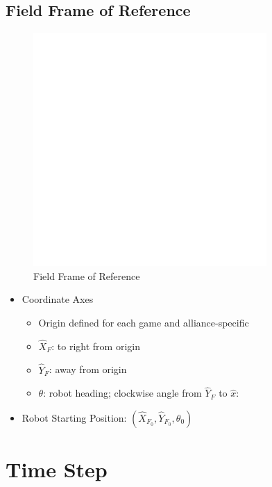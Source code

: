 \subsection{Field Frame of Reference}
\label{fieldframeofreference}

\begin{figure}[htbp]
\centering
\includegraphics[keepaspectratio,width=3.5in,height=0.75\textheight]{field_for}
\caption{Field Frame of Reference}
\label{field_for}
\end{figure}

\begin{itemize}
\item Coordinate Axes

\begin{itemize}
\item Origin defined for each game and alliance-specific

\item \(\hat{X}_F\): to right from origin

\item \(\hat{Y}_F\): away from origin

\item \(\theta\): robot heading; clockwise angle from \(\hat{Y}_F\) to \(\hat{x}\):

\end{itemize}

\item Robot Starting Position: \((\hat{X}_{F_0}, \hat{Y}_{F_0}, \theta_{0})\)

\end{itemize}

\section{Time Step}
\label{timestep}

